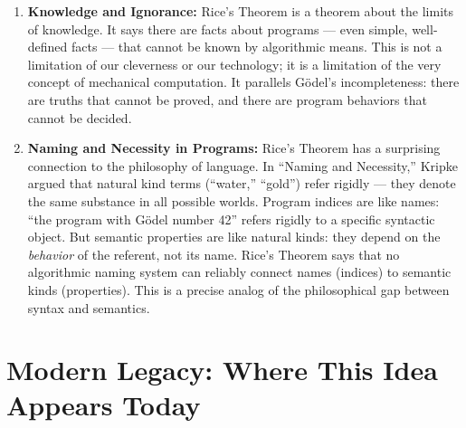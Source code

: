 \begin{enumerate}
\item \textbf{Knowledge and Ignorance:} Rice's Theorem is a theorem about the limits of knowledge. It says there are facts about programs --- even simple, well-defined facts --- that cannot be known by algorithmic means. This is not a limitation of our cleverness or our technology; it is a limitation of the very concept of mechanical computation. It parallels G\"odel's incompleteness: there are truths that cannot be proved, and there are program behaviors that cannot be decided.

\item \textbf{Naming and Necessity in Programs:} Rice's Theorem has a surprising connection to the philosophy of language. In ``Naming and Necessity,'' Kripke argued that natural kind terms (``water,'' ``gold'') refer rigidly --- they denote the same substance in all possible worlds. Program indices are like names: ``the program with G\"odel number 42'' refers rigidly to a specific syntactic object. But semantic properties are like natural kinds: they depend on the \emph{behavior} of the referent, not its name. Rice's Theorem says that no algorithmic naming system can reliably connect names (indices) to semantic kinds (properties). This is a precise analog of the philosophical gap between syntax and semantics.
\end{enumerate}

\section{Modern Legacy: Where This Idea Appears Today}
\label{sec:rice:legacy}

